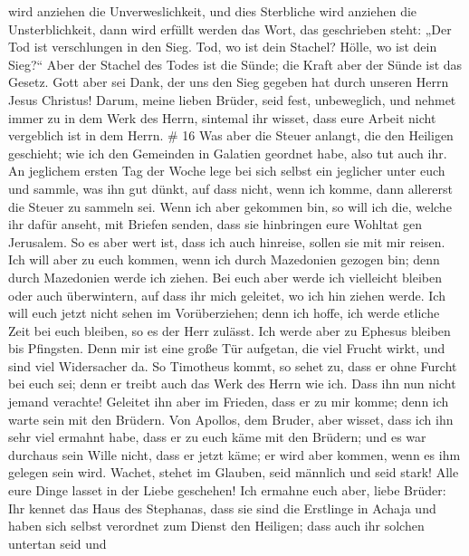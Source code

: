 wird anziehen die Unverweslichkeit, und dies Sterbliche wird anziehen
die Unsterblichkeit, dann wird erfüllt werden das Wort, das geschrieben
steht:  „Der Tod ist verschlungen in den Sieg. Tod, wo ist
dein Stachel? Hölle, wo ist dein Sieg?{}``  Aber der
Stachel des Todes ist die Sünde; die Kraft aber der Sünde ist das
Gesetz.  Gott aber sei Dank, der uns den Sieg gegeben hat
durch unseren Herrn Jesus Christus!  Darum, meine lieben
Brüder, seid fest, unbeweglich, und nehmet immer zu in dem Werk des
Herrn, sintemal ihr wisset, dass eure Arbeit nicht vergeblich ist in dem
Herrn. \# 16  Was aber die Steuer anlangt, die den Heiligen
geschieht; wie ich den Gemeinden in Galatien geordnet habe, also tut
auch ihr.  An jeglichem ersten Tag der Woche lege bei sich
selbst ein jeglicher unter euch und sammle, was ihn gut dünkt, auf dass
nicht, wenn ich komme, dann allererst die Steuer zu sammeln sei.
 Wenn ich aber gekommen bin, so will ich die, welche ihr
dafür anseht, mit Briefen senden, dass sie hinbringen eure Wohltat gen
Jerusalem.  So es aber wert ist, dass ich auch hinreise,
sollen sie mit mir reisen.  Ich will aber zu euch kommen,
wenn ich durch Mazedonien gezogen bin; denn durch Mazedonien werde ich
ziehen.  Bei euch aber werde ich vielleicht bleiben oder
auch überwintern, auf dass ihr mich geleitet, wo ich hin ziehen werde.
 Ich will euch jetzt nicht sehen im Vorüberziehen; denn ich
hoffe, ich werde etliche Zeit bei euch bleiben, so es der Herr zulässt.
 Ich werde aber zu Ephesus bleiben bis Pfingsten.
 Denn mir ist eine große Tür aufgetan, die viel Frucht
wirkt, und sind viel Widersacher da.  So Timotheus kommt,
so sehet zu, dass er ohne Furcht bei euch sei; denn er treibt auch das
Werk des Herrn wie ich.  Dass ihn nun nicht jemand
verachte! Geleitet ihn aber im Frieden, dass er zu mir komme; denn ich
warte sein mit den Brüdern.  Von Apollos, dem Bruder, aber
wisset, dass ich ihn sehr viel ermahnt habe, dass er zu euch käme mit
den Brüdern; und es war durchaus sein Wille nicht, dass er jetzt käme;
er wird aber kommen, wenn es ihm gelegen sein wird. 
Wachet, stehet im Glauben, seid männlich und seid stark! 
Alle eure Dinge lasset in der Liebe geschehen!  Ich ermahne
euch aber, liebe Brüder: Ihr kennet das Haus des Stephanas, dass sie
sind die Erstlinge in Achaja und haben sich selbst verordnet zum Dienst
den Heiligen;  dass auch ihr solchen untertan seid und
